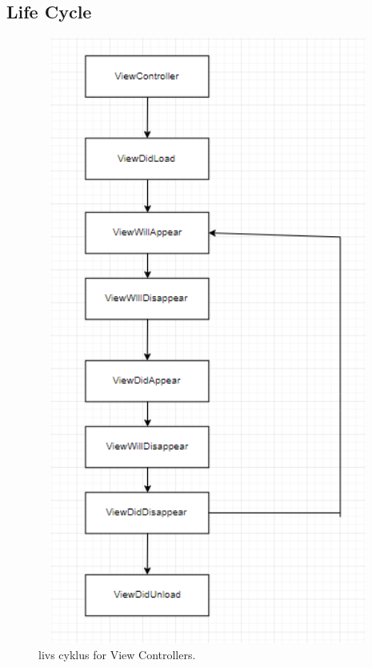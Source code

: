 \subsection{Life Cycle}
\begin{figure}[H] %
	\centering
	\includegraphics[height=20cm, width=12cm]{../ArkitekturDesign/Design/LifeCycle/LifeCycle}
	\caption{livs cyklus for View Controllers.}
	\label{fig:LifeCycle}
\end{figure}